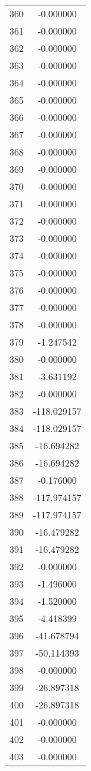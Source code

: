 \documentclass[12pt]{article}
\begin{document}
\begin{longtable}{@{}cc@{}}
360 & -0.000000 \\
361 & -0.000000 \\
362 & -0.000000 \\
363 & -0.000000 \\
364 & -0.000000 \\
365 & -0.000000 \\
366 & -0.000000 \\
367 & -0.000000 \\
368 & -0.000000 \\
369 & -0.000000 \\
370 & -0.000000 \\
371 & -0.000000 \\
372 & -0.000000 \\
373 & -0.000000 \\
374 & -0.000000 \\
375 & -0.000000 \\
376 & -0.000000 \\
377 & -0.000000 \\
378 & -0.000000 \\
379 & -1.247542 \\
380 & -0.000000 \\
381 & -3.631192 \\
382 & -0.000000 \\
383 & -118.029157 \\
384 & -118.029157 \\
385 & -16.694282 \\
386 & -16.694282 \\
387 & -0.176000 \\
388 & -117.974157 \\
389 & -117.974157 \\
390 & -16.479282 \\
391 & -16.479282 \\
392 & -0.000000 \\
393 & -1.496000 \\
394 & -1.520000 \\
395 & -4.418399 \\
396 & -41.678794 \\
397 & -50.114393 \\
398 & -0.000000 \\
399 & -26.897318 \\
400 & -26.897318 \\
401 & -0.000000 \\
402 & -0.000000 \\
403 & -0.000000 \\

\end{longtable}
\end{document}
